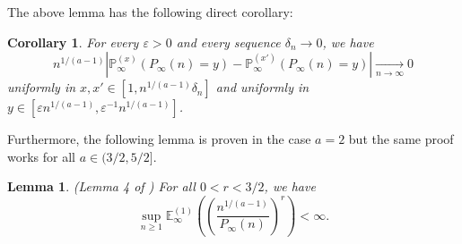 \documentclass[11pt]{article}
\newtheorem{lemma}[theorem]{Lemma}
\newtheorem{corollary}[theorem]{Corollary}
\numberwithin{equation}{section}
\def\vp{\varepsilon}
\def\E{\mathbb{E}}
\def\P{\mathbb{P}}
\begin{document}
The above lemma has the following direct corollary:
\begin{corollary}\label{corollaire decorrelation}
For every $\vp >0$ and every sequence $\delta_n \to 0$, we have
$$
n^{1/(a-1)}
\left\vert
\P^{(x)}_\infty(P_\infty(n)=y) - \P^{(x')}_\infty(P_\infty(n)=y)
\right\vert
\mathop{\longrightarrow}\limits_{n\to \infty} 0
$$
uniformly in $x,x' \in [1,n^{1/(a-1)}\delta_n]$ and uniformly in $y \in[\vp n^{1/(a-1)} , \vp^{-1} n^{1/(a-1)} ]$.
\end{corollary}

Furthermore, the following lemma is proven in the case $a=2$ but the same proof works for all $a \in (3/2, 5/2]$.
\begin{lemma}\label{lemme uniforme integrabilite}(Lemma 4 of \cite{BCM})
For all $0<r<3/2$, we have
$$
\sup_{n\ge 1} \E^{(1)}_\infty\left(
\left(\frac{n^{1/(a-1)}}{P_\infty(n)}\right)^r
\right)
<\infty.
$$
\end{lemma}
\end{document}
